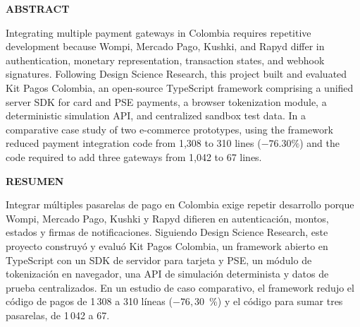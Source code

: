 \begin{center}
    \textbf{ABSTRACT}
\end{center}

\vspace{0.25cm}

Integrating multiple payment gateways in Colombia requires repetitive development because Wompi, Mercado Pago, Kushki, and Rapyd differ in authentication, monetary representation, transaction states, and webhook signatures. Following Design Science Research, this project built and evaluated Kit Pagos Colombia, an open-source TypeScript framework comprising a unified server SDK for card and PSE payments, a browser tokenization module, a deterministic simulation API, and centralized sandbox test data. In a comparative case study of two e-commerce prototypes, using the framework reduced payment integration code from 1,308 to 310 lines ($-76.30\%$) and the code required to add three gateways from 1,042 to 67 lines.

\begin{center}
    {\textbf{RESUMEN}}
\end{center}

\vspace{0.25cm}

Integrar múltiples pasarelas de pago en Colombia exige repetir desarrollo porque Wompi, Mercado Pago, Kushki y Rapyd difieren en autenticación, montos, estados y firmas de notificaciones. Siguiendo Design Science Research, este proyecto construyó y evaluó Kit Pagos Colombia, un framework abierto en TypeScript con un SDK de servidor para tarjeta y PSE, un módulo de tokenización en navegador, una API de simulación determinista y datos de prueba centralizados. En un estudio de caso comparativo, el framework redujo el código de pagos de 1\,308 a 310 líneas ($-76{,}30$~\%) y el código para sumar tres pasarelas, de 1\,042 a 67.
